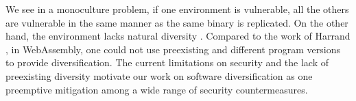 We see in \wasm a monoculture problem, if one environment is vulnerable, all the others are vulnerable in the same manner as the same \wasm binary is replicated. 
On the other hand, the \wasm environment lacks natural diversity \cite{natural_diversity}. Compared to the work of Harrand \etal \citationneeded, in WebAssembly, one could not use preexisting and different program versions to provide diversification. The current limitations on security and the lack of preexisting diversity motivate our work on software diversification as one preemptive mitigation among a wide range of security countermeasures. 



